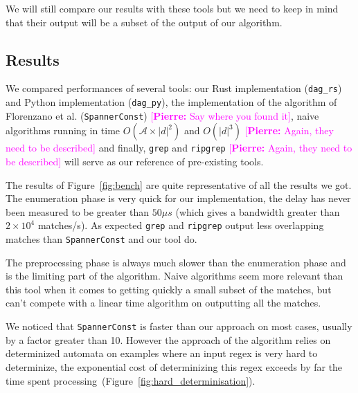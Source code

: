 \documentclass[12px]{article}
\theoremstyle{definition}
\newcommand{\pierre}[1]{\textcolor{magenta}{[\textbf{Pierre:} #1]}}
\begin{document}
      We will still compare our results with these tools but we need to
      keep in mind that their output will be a subset of the output of our
      algorithm.

    \subsection{Results}

      We compared performances of several tools: our Rust implementation
      (\texttt{dag\_rs}) and Python implementation (\texttt{dag\_py}), the
      implementation of the algorithm of Florenzano et al.
      \cite{florenzano2018constant} (\texttt{SpannerConst}) \pierre{Say where
      you found it}, naive algorithms running in time $O(\mathcal{A} \times
      |d|^2)$ and $O(|d|^3)$ \pierre{Again, they need to be described} and
      finally, \texttt{grep} and \texttt{ripgrep} \pierre{Again, they need to
      be described} will serve as our reference of pre-existing tools.

      The results of Figure~\ref{fig:bench} are quite representative of all the
      results we got. The enumeration phase is very quick for our
      implementation, the delay has never been measured to be greater than $50
      \mu s$ (which gives a bandwidth greater than $2 \times 10^4$ matches/s).
      As expected \texttt{grep} and \texttt{ripgrep} output less overlapping
      matches than \texttt{SpannerConst} and our tool do.

      The preprocessing phase is always much slower than the enumeration phase
      and is the limiting part of the algorithm. Naive algorithms seem more
      relevant than this tool when it comes to getting quickly a small subset
      of the matches, but can't compete with a linear time algorithm on
      outputting all the matches.

      We noticed that \texttt{SpannerConst} is faster than our approach on most
      cases, usually by a factor greater than 10. However the approach of the
      algorithm relies on determinized automata on examples where an input
      regex is very hard to determinize, the exponential cost of determinizing
      this regex exceeds by far the time spent
      processing~(Figure~\ref{fig:hard_determinisation}).
\end{document}
